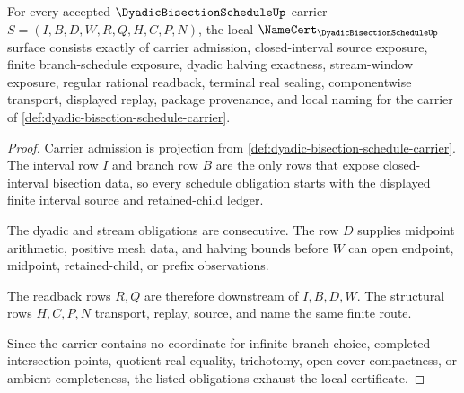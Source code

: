\begin{theorem}
\label{thm:dyadic-bisection-schedule-namecert-obligations}
For every accepted $\DyadicBisectionScheduleUp$ carrier $S=(I,B,D,W,R,Q,H,C,P,N)$, the local $\NameCert_{\DyadicBisectionScheduleUp}$ surface consists exactly of carrier admission, closed-interval source exposure, finite branch-schedule exposure, dyadic halving exactness, stream-window exposure, regular rational readback, terminal real sealing, componentwise transport, displayed replay, package provenance, and local naming for the carrier of \autoref{def:dyadic-bisection-schedule-carrier}.
\end{theorem}
\begin{proof}
Carrier admission is projection from \autoref{def:dyadic-bisection-schedule-carrier}. The interval row $I$ and branch row $B$ are the only rows that expose closed-interval bisection data, so every schedule obligation starts with the displayed finite interval source and retained-child ledger.

The dyadic and stream obligations are consecutive. The row $D$ supplies midpoint arithmetic, positive mesh data, and halving bounds before $W$ can open endpoint, midpoint, retained-child, or prefix observations.

The readback rows $R,Q$ are therefore downstream of $I,B,D,W$. The structural rows $H,C,P,N$ transport, replay, source, and name the same finite route.

Since the carrier contains no coordinate for infinite branch choice, completed intersection points, quotient real equality, trichotomy, open-cover compactness, or ambient completeness, the listed obligations exhaust the local certificate.
\end{proof}

